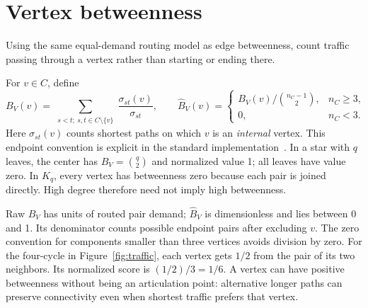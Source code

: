 \documentclass[11pt]{article}
\newcommand{\plain}[1]{\noindent #1\par\smallskip}
\begin{document}
\clearpage
\section{Vertex betweenness}\label{sec:vertex-between}
\plain{Using the same equal-demand routing model as edge betweenness, count traffic passing through a vertex rather than starting or ending there.}
For $v\in C$, define
\begin{equation}
 B_V(v)=\sum_{\substack{s<t;\ s,t\in C\setminus\{v\}}}
 \frac{\sigma_{st}(v)}{\sigma_{st}},\qquad
 \widehat B_V(v)=\begin{cases}
 B_V(v)/\binom{n_C-1}{2},&n_C\geq3,\\0,&n_C<3.
 \end{cases}
\end{equation}
Here $\sigma_{st}(v)$ counts shortest paths on which $v$ is an \emph{internal} vertex. This endpoint convention is explicit in the standard implementation~\cite{nxvertex}. In a star with $q$ leaves, the center has $B_V=\binom q2$ and normalized value 1; all leaves have value zero. In $K_q$, every vertex has betweenness zero because each pair is joined directly. High degree therefore need not imply high betweenness.

Raw $B_V$ has units of routed pair demand; $\widehat B_V$ is dimensionless and lies between 0 and 1. Its denominator counts possible endpoint pairs after excluding $v$. The zero convention for components smaller than three vertices avoids division by zero. For the four-cycle in Figure~\ref{fig:traffic}, each vertex gets $1/2$ from the pair of its two neighbors. Its normalized score is $(1/2)/3=1/6$. A vertex can have positive betweenness without being an articulation point: alternative longer paths can preserve connectivity even when shortest traffic prefers that vertex.
\end{document}
